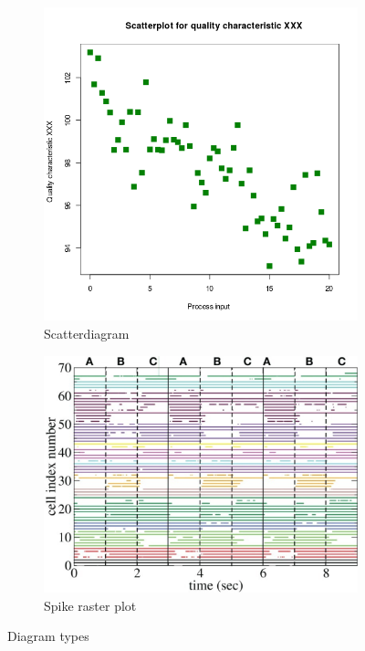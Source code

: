 \documentclass[twoside, english, draft]{Pflichtenheft}
\begin{document}
\begin{figure}[!h]
\begin{subfigure}[h]{0.475\textwidth}
		\includegraphics[width=\textwidth]{Images/Scatter_diagram.png}
		\caption[]%
		{{\small Scatterdiagram}}
		\label{fig:Diagram types}
	\end{subfigure}
	\quad
	\begin{subfigure}[h]{0.475\textwidth}
		\centering
		\includegraphics[width=\textwidth]{Images/spike_raster_plot.png}
		\caption[]%
		{{\small Spike raster plot}}
		\label{fig:mean and std of net44}
	\end{subfigure}
	\caption[ Diagram types ]
	{\small Diagram types}
	\label{fig:Diagram types}
\end{figure}
\vfill
\end{document}
